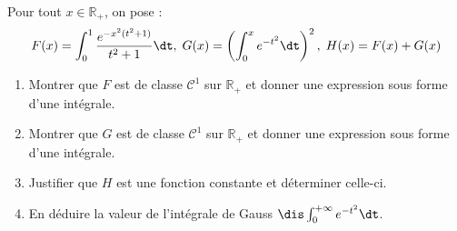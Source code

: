 \documentclass[a4paper,10pt]{report}
\begin{document}
\begin{Exercice}{} Pour tout $x \in \mathbb{R}_+$, on pose :
 $$ F(x) = \int_{0}^1 \frac{e^{-x^2(t^2+1)}}{t^2+1} \dt, \; G(x) = \left( \int_{0}^x e^{-t^2} \dt \right)^2, \; H(x)=F(x)+G(x)$$
 
 \begin{enumerate}
 \item Montrer que $F$ est de classe $\mathcal{C}^1$ sur $\mathbb{R}_+$ et donner une expression sous forme d'une intégrale.
 \item Montrer que $G$ est de classe $\mathcal{C}^1$ sur $\mathbb{R}_+$ et donner une expression sous forme d'une intégrale.
 \item Justifier que $H$ est une fonction constante et déterminer celle-ci.
 \item En déduire la valeur de l'intégrale de Gauss $\dis \int_{0}^{+ \infty} e^{-t^2} \dt$.
 \end{enumerate}
\end{Exercice}

\corr 
\end{document}
